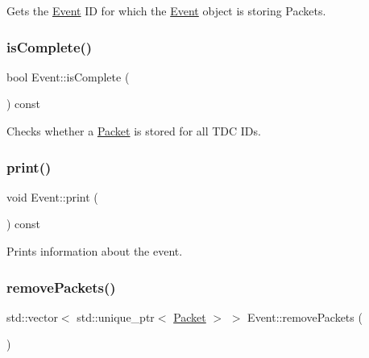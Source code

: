 Gets the \hyperlink{class_event}{Event} ID for which the \hyperlink{class_event}{Event} object is storing Packets. 

\mbox{\label{class_event_a2a00b2c0c579397ac93c834cf987cbd9}} 
\subsubsection{\texorpdfstring{is\+Complete()}{isComplete()}}
{\footnotesize\ttfamily bool Event\+::is\+Complete (\begin{DoxyParamCaption}{ }\end{DoxyParamCaption}) const\hspace{0.3cm}{\ttfamily [inline]}}



Checks whether a \hyperlink{class_packet}{Packet} is stored for all T\+DC I\+Ds. 

\mbox{\label{class_event_ab1b48a39a41a7fc92a25617adcf68aa8}} 
\subsubsection{\texorpdfstring{print()}{print()}}
{\footnotesize\ttfamily void Event\+::print (\begin{DoxyParamCaption}{ }\end{DoxyParamCaption}) const}



Prints information about the event. 

\mbox{\label{class_event_a4a7c0f87ea9fd8526451d6eddc3a592e}} 
\subsubsection{\texorpdfstring{remove\+Packets()}{removePackets()}}
{\footnotesize\ttfamily std\+::vector$<$ std\+::unique\+\_\+ptr$<$ \hyperlink{class_packet}{Packet} $>$ $>$ Event\+::remove\+Packets (\begin{DoxyParamCaption}{ }\end{DoxyParamCaption})}



